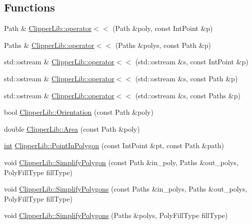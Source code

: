 \subsection*{Functions}
\begin{DoxyCompactItemize}
\item 
Path \& \mbox{\hyperlink{namespace_clipper_lib_a7783da3ed1c2354e45db83cecc596c7e}{Clipper\+Lib\+::operator$<$$<$}} (Path \&poly, const Int\+Point \&p)
\item 
Paths \& \mbox{\hyperlink{namespace_clipper_lib_aa0bb38565ca4b15c637b38f476d21036}{Clipper\+Lib\+::operator$<$$<$}} (Paths \&polys, const Path \&p)
\item 
std\+::ostream \& \mbox{\hyperlink{namespace_clipper_lib_a2e9613a92f21ac827d5b7f8b5ade5795}{Clipper\+Lib\+::operator$<$$<$}} (std\+::ostream \&s, const Int\+Point \&p)
\item 
std\+::ostream \& \mbox{\hyperlink{namespace_clipper_lib_abd88603a8c170404d069edae2e574fe9}{Clipper\+Lib\+::operator$<$$<$}} (std\+::ostream \&s, const Path \&p)
\item 
std\+::ostream \& \mbox{\hyperlink{namespace_clipper_lib_aa8b8872f6e4840cb63769a59a88eab4d}{Clipper\+Lib\+::operator$<$$<$}} (std\+::ostream \&s, const Paths \&p)
\item 
bool \mbox{\hyperlink{namespace_clipper_lib_a806a3d33d76bb9d4479d384f876ce8bd}{Clipper\+Lib\+::\+Orientation}} (const Path \&poly)
\item 
double \mbox{\hyperlink{namespace_clipper_lib_a4a96cc48117e1dba6cf51bbc2d91fe97}{Clipper\+Lib\+::\+Area}} (const Path \&poly)
\item 
\mbox{\hyperlink{draw_8hh_aa620a13339ac3a1177c86edc549fda9b}{int}} \mbox{\hyperlink{namespace_clipper_lib_ac7314f2a1f45c627bac20e9ba2a68212}{Clipper\+Lib\+::\+Point\+In\+Polygon}} (const Int\+Point \&pt, const Path \&path)
\item 
void \mbox{\hyperlink{namespace_clipper_lib_af374cea59a991e49f36c3530efc45feb}{Clipper\+Lib\+::\+Simplify\+Polygon}} (const Path \&in\+\_\+poly, Paths \&out\+\_\+polys, Poly\+Fill\+Type fill\+Type)
\item 
void \mbox{\hyperlink{namespace_clipper_lib_ac9ebbe437e4c08816bffeced6d001cf6}{Clipper\+Lib\+::\+Simplify\+Polygons}} (const Paths \&in\+\_\+polys, Paths \&out\+\_\+polys, Poly\+Fill\+Type fill\+Type)
\item 
void \mbox{\hyperlink{namespace_clipper_lib_ac43b677f95d30bd595bbdd5eb79cdcec}{Clipper\+Lib\+::\+Simplify\+Polygons}} (Paths \&polys, Poly\+Fill\+Type fill\+Type)

\end{DoxyCompactItemize}
